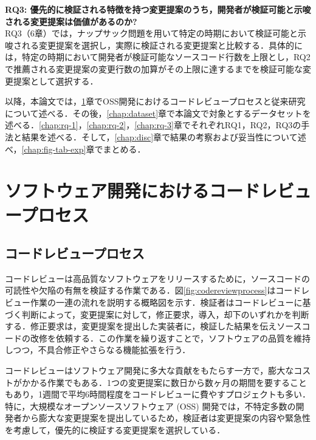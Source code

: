 \documentclass[T,J]{fose} %
\newcommand{\rqthree}{優先的に検証される特徴を持つ変更提案のうち，開発者が検証可能と示唆される変更提案は価値があるのか?}
\begin{document}
\noindent\textbf{RQ3: \rqthree}\\
RQ3（6章）では，ナップサック問題を用いて特定の時期において検証可能と示唆される変更提案を選択し，実際に検証される変更提案と比較する．具体的には，特定の時期において開発者が検証可能なソースコード行数を上限とし，RQ2で推薦される変更提案の変更行数の加算がその上限に達するまでを検証可能な変更提案として選択する．

以降，本論文では，\ref{chap:intro}章でOSS開発におけるコードレビュープロセスと従来研究について述べる．その後，\ref{chap:dataset}章で本論文で対象とするデータセットを述べる．\ref{chap:rq-1}，\ref{chap:rq-2}，\ref{chap:rq-3}章でそれぞれRQ1，RQ2，RQ3の手法と結果を述べる．そして，\ref{chap:disc}章で結果の考察および妥当性について述べ，\ref{chap:fig-tab-exp}章でまとめる．

\section{ソフトウェア開発におけるコードレビュープロセス}\label{chap:intro}

\subsection{コードレビュープロセス}

コードレビューは高品質なソフトウェアをリリースするために，ソースコードの可読性や欠陥の有無を検証する作業である．図\ref{fig:codereviewprocess}はコードレビュー作業の一連の流れを説明する概略図を示す．検証者はコードレビューに基づく判断によって，変更提案に対して，修正要求，導入，却下のいずれかを判断する．修正要求は，変更提案を提出した実装者に，検証した結果を伝えソースコードの改修を依頼する．この作業を繰り返すことで，ソフトウェアの品質を維持しつつ，不具合修正やさらなる機能拡張を行う．

コードレビューはソフトウェア開発に多大な貢献をもたらす一方で，膨大なコストがかかる作業でもある．1つの変更提案に数日から数ヶ月の期間を要することもあり，1週間で平均6時間程度をコードレビューに費やすプロジェクトも多い\cite{review2}．特に，大規模なオープンソースソフトウェア (OSS) 開発では，不特定多数の開発者から膨大な変更提案を提出しているため，検証者は変更提案の内容や緊急性を考慮して，優先的に検証する変更提案を選択している\cite{}．
\end{document}
